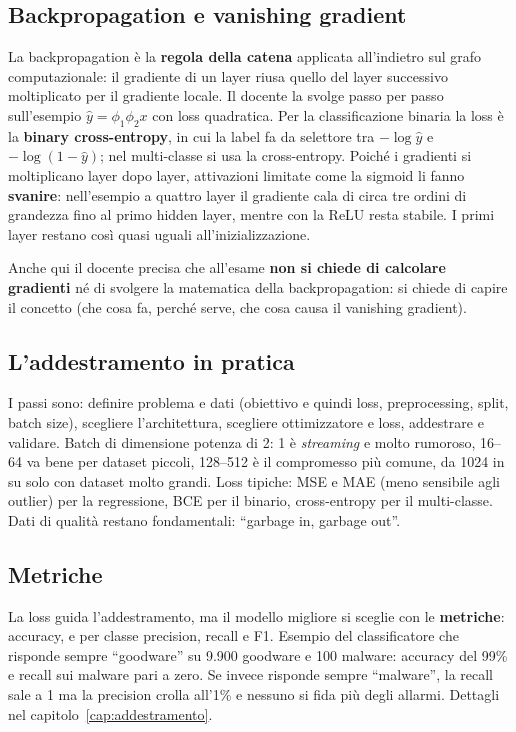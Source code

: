 \subsection{Backpropagation e vanishing gradient}
La backpropagation è la \textbf{regola della catena} applicata all'indietro sul grafo
computazionale: il gradiente di un layer riusa quello del layer successivo moltiplicato per il
gradiente locale. Il docente la svolge passo per passo sull'esempio $\hat y = \phi_1\phi_2 x$ con loss
quadratica. Per la classificazione binaria la loss è la \textbf{binary cross-entropy}, in cui la label
fa da selettore tra $-\log\hat y$ e $-\log(1-\hat y)$; nel multi-classe si usa la cross-entropy.
Poiché i gradienti si moltiplicano layer dopo layer, attivazioni limitate come la sigmoid li fanno
\textbf{svanire}: nell'esempio a quattro layer il gradiente cala di circa tre ordini di grandezza fino
al primo hidden layer, mentre con la ReLU resta stabile. I primi layer restano così quasi uguali
all'inizializzazione.

\begin{esame}
Anche qui il docente precisa che all'esame \textbf{non si chiede di calcolare gradienti} né di
svolgere la matematica della backpropagation: si chiede di capire il concetto (che cosa fa, perché
serve, che cosa causa il vanishing gradient).
\end{esame}

\subsection{L'addestramento in pratica}
I passi sono: definire problema e dati (obiettivo e quindi loss, preprocessing, split, batch size),
scegliere l'architettura, scegliere ottimizzatore e loss, addestrare e validare. Batch di dimensione
potenza di 2: 1 è \emph{streaming} e molto rumoroso, 16--64 va bene per dataset piccoli, 128--512 è il
compromesso più comune, da 1024 in su solo con dataset molto grandi. Loss tipiche: MSE e MAE (meno
sensibile agli outlier) per la regressione, BCE per il binario, cross-entropy per il multi-classe.
Dati di qualità restano fondamentali: ``garbage in, garbage out''.

\subsection{Metriche}
La loss guida l'addestramento, ma il modello migliore si sceglie con le \textbf{metriche}: accuracy,
e per classe precision, recall e F1. Esempio del classificatore che risponde sempre ``goodware'' su
9.900 goodware e 100 malware: accuracy del 99\% e recall sui malware pari a zero. Se invece risponde
sempre ``malware'', la recall sale a 1 ma la precision crolla all'1\% e nessuno si fida più degli
allarmi. Dettagli nel capitolo~\ref{cap:addestramento}.

